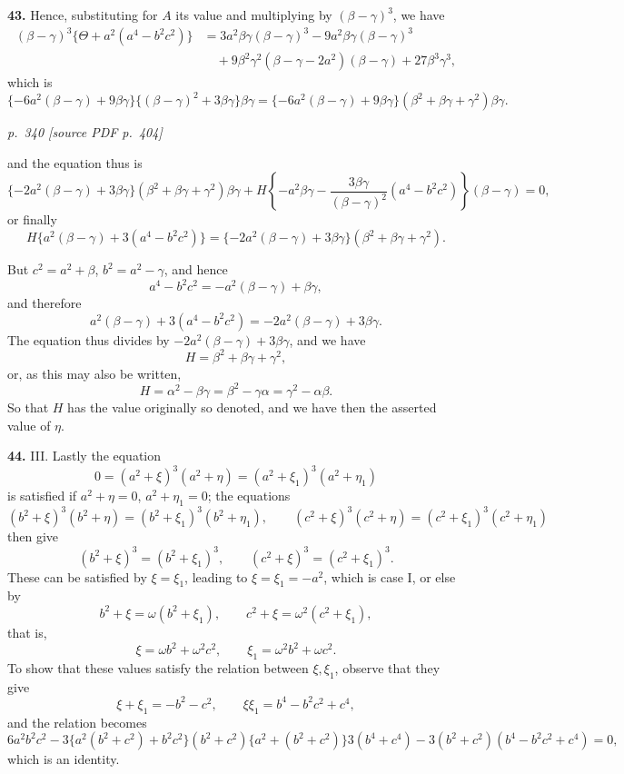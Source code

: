 \documentclass[11pt,a4paper]{article}
\newcommand{\pagemarker}[2]{\par\bigskip\noindent\textit{p.~#1 [source PDF p.~#2]}\par\smallskip}
\begin{document}
\textbf{43.} Hence, substituting for $A$ its value and multiplying by $(\beta-\gamma)^3$, we have
\begin{align*}
(\beta-\gamma)^3\{\Theta+a^2(a^4-b^2c^2)\}
&=3a^2\beta\gamma(\beta-\gamma)^3
-9a^2\beta\gamma(\beta-\gamma)^3\\
&\quad+9\beta^2\gamma^2(\beta-\gamma-2a^2)(\beta-\gamma)
+27\beta^3\gamma^3,
\end{align*}
which is
\[
\{-6a^2(\beta-\gamma)+9\beta\gamma\}\{(\beta-\gamma)^2+3\beta\gamma\}\beta\gamma
=\{-6a^2(\beta-\gamma)+9\beta\gamma\}(\beta^2+\beta\gamma+\gamma^2)\beta\gamma .
\]

\clearpage

\pagemarker{340}{404}

and the equation thus is
\[
\{-2a^2(\beta-\gamma)+3\beta\gamma\}(\beta^2+\beta\gamma+\gamma^2)\beta\gamma
 +H\left\{-a^2\beta\gamma-\frac{3\beta\gamma}{(\beta-\gamma)^2}(a^4-b^2c^2)\right\}(\beta-\gamma)=0,
\]
or finally
\[
H\{a^2(\beta-\gamma)+3(a^4-b^2c^2)\}
=\{-2a^2(\beta-\gamma)+3\beta\gamma\}(\beta^2+\beta\gamma+\gamma^2).
\]

But $c^2=a^2+\beta$, $b^2=a^2-\gamma$, and hence
\[
a^4-b^2c^2=-a^2(\beta-\gamma)+\beta\gamma,
\]
and therefore
\[
a^2(\beta-\gamma)+3(a^4-b^2c^2)=-2a^2(\beta-\gamma)+3\beta\gamma.
\]
The equation thus divides by $-2a^2(\beta-\gamma)+3\beta\gamma$, and we have
\[
H=\beta^2+\beta\gamma+\gamma^2,
\]
or, as this may also be written,
\[
H=\alpha^2-\beta\gamma=\beta^2-\gamma\alpha=\gamma^2-\alpha\beta.
\]
So that $H$ has the value originally so denoted, and we have then the asserted value of $\eta$.

\textbf{44.} III. Lastly the equation
\[
0=(a^2+\xi)^3(a^2+\eta)=(a^2+\xi_1)^3(a^2+\eta_1)
\]
is satisfied if $a^2+\eta=0$, $a^2+\eta_1=0$; the equations
\[
(b^2+\xi)^3(b^2+\eta)=(b^2+\xi_1)^3(b^2+\eta_1),
\qquad
(c^2+\xi)^3(c^2+\eta)=(c^2+\xi_1)^3(c^2+\eta_1)
\]
then give
\[
(b^2+\xi)^3=(b^2+\xi_1)^3,\qquad
(c^2+\xi)^3=(c^2+\xi_1)^3.
\]
These can be satisfied by $\xi=\xi_1$, leading to $\xi=\xi_1=-a^2$, which is case I, or else by
\[
b^2+\xi=\omega(b^2+\xi_1),\qquad
c^2+\xi=\omega^2(c^2+\xi_1),
\]
that is,
\[
\xi=\omega b^2+\omega^2c^2,\qquad
\xi_1=\omega^2 b^2+\omega c^2.
\]
To show that these values satisfy the relation between $\xi,\xi_1$, observe that they give
\[
\xi+\xi_1=-b^2-c^2,\qquad
\xi\xi_1=b^4-b^2c^2+c^4,
\]
and the relation becomes
\[
6a^2b^2c^2-3\{a^2(b^2+c^2)+b^2c^2\}(b^2+c^2)
\{a^2+(b^2+c^2)\}3(b^4+c^4)
-3(b^2+c^2)(b^4-b^2c^2+c^4)=0,
\]
which is an identity.
\end{document}
